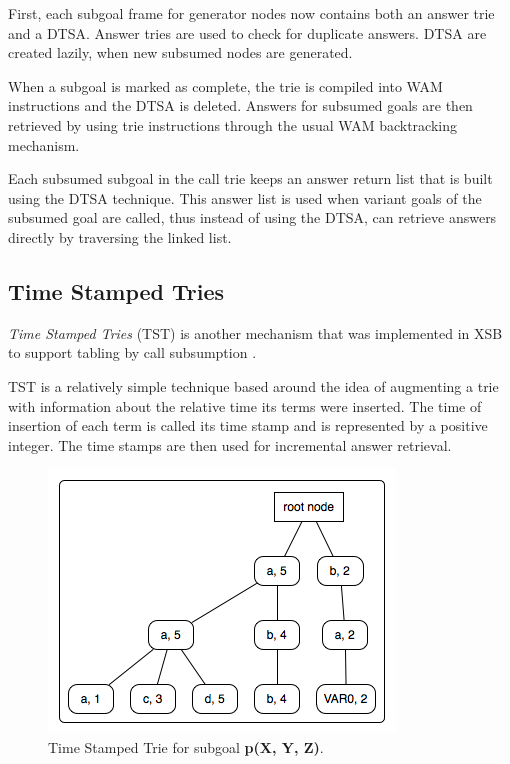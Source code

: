   First, each subgoal frame for generator nodes now contains both an answer trie and a DTSA.
  Answer tries are used to check for duplicate answers. DTSA are created lazily, when new subsumed nodes
  are generated.
  
  When a subgoal is marked as complete, the trie is compiled into WAM instructions and the DTSA is deleted.
  Answers for subsumed goals are then retrieved by using trie instructions through the usual WAM backtracking
  mechanism.
  
  Each subsumed subgoal in the call trie keeps an answer return list that is built using the DTSA technique.
  This answer list is used when variant goals of the subsumed goal are called, thus instead of using
  the DTSA, can retrieve answers directly by traversing the linked list.
  
\subsection{Time Stamped Tries} \label{sec:time_stamped_tries}

  \textit{Time Stamped Tries} (TST) is another mechanism that was implemented in XSB
  to support tabling by call subsumption \cite{Johnson-99}.
  
  TST is a relatively simple technique based around the idea of augmenting a trie with information about the relative time
  its terms were inserted. The time of insertion of each term is called its time stamp and is represented by a
  positive integer. The time stamps are then used for incremental answer retrieval.
  
  \begin{figure}[ht]
    \centering
      \includegraphics[scale=0.6]{tst_1.png}
    \caption{Time Stamped Trie for subgoal \textbf{p(X, Y, Z)}.}
    \label{fig:tst_1}
  \end{figure}
  
